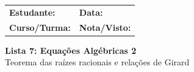 \documentclass[12pt,a4paper]{article}
\begin{document}
\begin{tcolorbox}[colback=bglight, colframe=primary, boxrule=1pt, arc=3pt]
  \sffamily\small
  \begin{tabular}{@{}p{} p{}@{}}
    \textbf{Estudante:} \hrulefill & \textbf{Data:} \hrulefill \\[0.25cm]
    \textbf{Curso/Turma:} \hrulefill & \textbf{Nota/Visto:} \hrulefill
  \end{tabular}
\end{tcolorbox}

\begin{center}
  {\LARGE\bfseries\color{primary}  Lista 7: Equações Algébricas 2} \\[0.1cm]
  {\small\sffamily\color{gray} Teorema das raízes racionais e relações de Girard}
\end{center}

\vspace{0.1cm}
\end{document}
